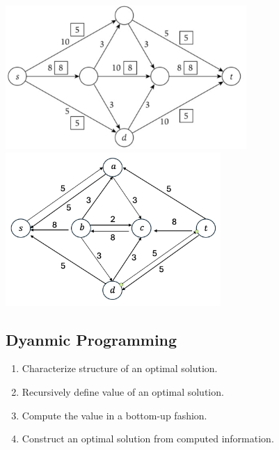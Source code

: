 \documentclass{article}
\begin{document}
\begin{multicols*}{2}
    \begin{multicols*}{2}
        \includegraphics[width=\linewidth]{residual1.png}
        \includegraphics[width=\linewidth]{residual2.png}
    \end{multicols*}


    \subsection*{Dyanmic Programming}
    \begin{enumerate}
        \item Characterize structure of an optimal solution.
        \item Recursively define value of an optimal solution.
        \item Compute the value in a bottom-up fashion.
        \item Construct an optimal solution from computed information.
    \end{enumerate}

\end{multicols*}
\end{document}
